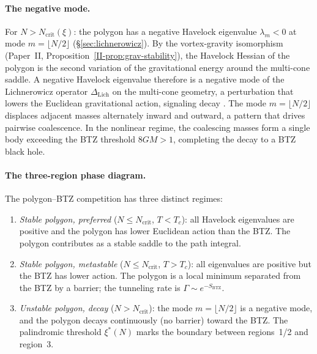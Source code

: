 \paragraph{The negative mode.}
For $N > N_{\mathrm{crit}}(\xi)$: the polygon has a negative
Havelock eigenvalue
$\lambda_m < 0$ at mode $m = \lfloor N/2 \rfloor$
(\S\ref{sec:lichnerowicz}).
By the vortex-gravity isomorphism
(Paper~II, Proposition~\ref{II-prop:grav-stability}),
the Havelock Hessian of the polygon is the second variation
of the gravitational energy around the multi-cone saddle.
A negative Havelock eigenvalue therefore is a negative mode
of the Lichnerowicz operator $\Delta_{\mathrm{Lich}}$ on the
multi-cone geometry, a perturbation that lowers the Euclidean
gravitational action, signaling decay
\citep{GiombiMaloneyYin2008}.
The mode $m = \lfloor N/2\rfloor$ displaces adjacent masses
alternately inward and outward, a pattern that drives pairwise
coalescence.
In the nonlinear regime, the coalescing masses form a single
body exceeding the BTZ threshold $8GM > 1$, completing the
decay to a BTZ black hole.

\paragraph{The three-region phase diagram.}
The polygon--BTZ competition has three distinct regimes:
\begin{enumerate}
\item \emph{Stable polygon, preferred}
  ($N \le N_{\mathrm{crit}}$, $T < T_c$):
  all Havelock eigenvalues are positive and the polygon has
  lower Euclidean action than the BTZ.
  The polygon contributes as a stable saddle to the path
  integral.
\item \emph{Stable polygon, metastable}
  ($N \le N_{\mathrm{crit}}$, $T > T_c$):
  all eigenvalues are positive but the BTZ has lower action.
  The polygon is a local minimum separated from the BTZ by a
  barrier; the tunneling rate is $\Gamma \sim e^{-S_{\mathrm{BTZ}}}$.
\item \emph{Unstable polygon, decay}
  ($N > N_{\mathrm{crit}}$):
  the mode $m = \lfloor N/2\rfloor$ is a negative mode, and
  the polygon decays continuously (no barrier) toward the BTZ.
  The palindromic threshold $\xi^*(N)$ marks the boundary
  between regions~1/2 and region~3.
\end{enumerate}

